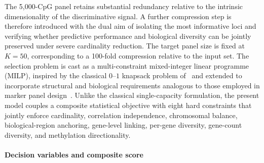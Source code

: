 The 5{,}000-CpG panel retains substantial redundancy relative to the intrinsic
dimensionality of the discriminative signal. A further compression step is therefore
introduced with the dual aim of isolating the most informative loci and verifying
whether predictive performance and biological diversity can be jointly preserved
under severe cardinality reduction. The target panel size is fixed at $K = 50$,
corresponding to a 100-fold compression relative to the input set.
The selection problem is cast as a multi-constraint mixed-integer linear programme
(MILP), inspired by the classical $0$--$1$ knapsack problem of~\cite{dantzig1957}
and extended to incorporate structural and biological requirements analogous to
those employed in marker panel design~\cite{wu2016snp,nishiyama2022ilp}. Unlike
the classical single-capacity formulation, the present model couples a composite
statistical objective with eight hard constraints that jointly enforce cardinality,
correlation independence, chromosomal balance, biological-region anchoring,
gene-level linking, per-gene diversity, gene-count diversity,
and methylation directionality.

\paragraph{Decision variables and composite score}

